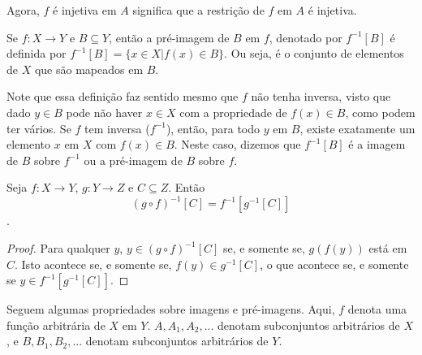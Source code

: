 Agora, $f$ é injetiva em $A$ significa que a restrição de $f$ em $A$ é injetiva.

\begin{definition}
    \label{def10}
    Se $f: X \to Y$ e $B \subseteq Y$, então a pré-imagem de $B$ em $f$, denotado por $f^{-1}[B]$ é
    definida por $f^{-1}[B] = \{x \in X | f(x) \in B\}$. Ou seja, é o conjunto de elementos de $X$ que
    são mapeados em $B$.
\end{definition}

Note que essa definição faz sentido mesmo que $f$ não tenha inversa, visto que dado $y \in B$ pode não
haver $x \in X$ com a propriedade de $f(x) \in B$, como podem ter vários. Se $f$ tem inversa ($f^{-1}$),
então, para todo $y$ em $B$, existe exatamente um elemento $x$ em $X$ com $f(x) \in B$. Neste caso,
dizemos que $f^{-1}[B]$ é a imagem de $B$ sobre $f^{-1}$ ou a pré-imagem de $B$ sobre $f$.

\begin{theorem}
    Seja $f: X \to Y$, $g: Y \to Z$ e $C \subseteq Z$. Então $$(g \circ f)^{-1}[C] = f^{-1}[g^{-1}[C]]$$.
\end{theorem}
\begin{proof}
    Para qualquer $y$, $y \in (g \circ f)^{-1}[C]$ se, e somente se, $g(f(y))$ está em $C$.
    Isto acontece se, e somente se, $f(y) \in g^{-1}[C]$, o que acontece se, e somente se $y \in f^{-1}[g^{-1}[C]]$.
\end{proof}

Seguem algumas propriedades sobre imagens e pré-imagens. Aqui, $f$ denota uma função
arbitrária de $X$ em $Y$. $A, A_1, A_2, ...$ denotam subconjuntos arbitrários de $X$,
e $B, B_1, B_2,...$ denotam subconjuntos arbitrários de $Y$.

